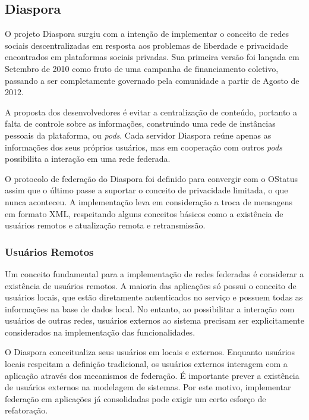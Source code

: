 \subsection{Diaspora}

O projeto Diaspora surgiu com a intenção de implementar o conceito de redes sociais
descentralizadas em resposta aos problemas de liberdade e privacidade encontrados em
plataformas sociais privadas. Sua primeira versão foi lançada em Setembro de 2010
como fruto de uma campanha de financiamento coletivo, passando a ser completamente
governado pela comunidade a partir de Agosto de 2012.

A proposta dos desenvolvedores é evitar a centralização de conteúdo, portanto a
falta de controle sobre as informações, construindo uma rede de instâncias pessoais
da plataforma, ou \textit{pods}. Cada servidor Diaspora reúne apenas as informações
dos seus próprios usuários, mas em cooperação com outros \textit{pods} possibilita a
interação em uma rede federada.

O protocolo de federação do Diaspora foi definido para convergir com o OStatus assim
que o último passe a suportar o conceito de privacidade limitada, o que nunca
aconteceu. A implementação leva em consideração a troca de mensagens em formato XML,
respeitando alguns conceitos básicos como a existência de usuários remotos e
atualização remota e retransmissão.

\subsubsection{Usuários Remotos}

Um conceito fundamental para a implementação de redes federadas é considerar a
existência de usuários remotos. A maioria das aplicações só possui o conceito de
usuários locais, que estão diretamente autenticados no serviço e possuem todas as
informações na base de dados local. No entanto, ao possibilitar a interação com
usuários de outras redes, usuários externos ao sistema precisam ser explicitamente
considerados na implementação das funcionalidades.

O Diaspora conceitualiza seus usuários em locais e externos. Enquanto usuários locais
respeitam a definição tradicional, os usuários externos interagem com a aplicação
através dos mecanismos de federação. É importante prever a existência de usuários
externos na modelagem de sistemas. Por este motivo, implementar federação em
aplicações já consolidadas pode exigir um certo esforço de refatoração.

